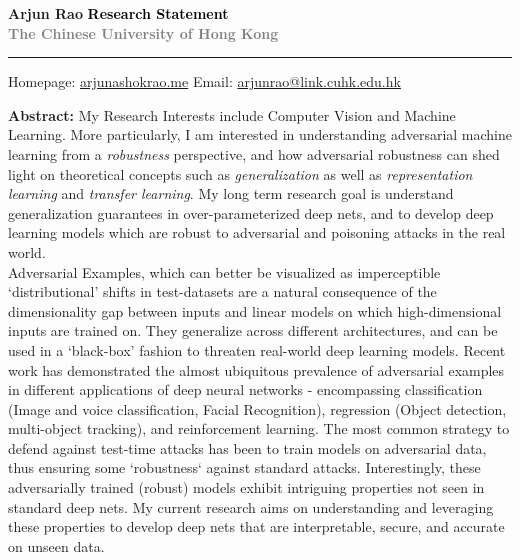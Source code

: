\documentclass[12pt]{article}
\newcommand{\HRule}[1][\medskipamount]{\par
  \vspace*{\dimexpr-\parskip-\baselineskip+#1}
  \noindent\rule{\linewidth}{0.3mm}\par
  \vspace*{\dimexpr-\parskip-.3\baselineskip+#1}}
\begin{document}
\thispagestyle{empty}
\Large \textbf{Arjun Rao} \hfill \Large  \textbf{\textcolor{black}{\Large{Research Statement} }} \\ \textcolor{gray}{\textbf{\hspace*{0.25in}\normalsize{The Chinese University of Hong Kong}}}
\HRule

\small Homepage: \href{https://arjunashokrao.me}{arjunashokrao.me} \quad Email: \href{mailto:arjunrao@link.cuhk.edu.hk}{arjunrao@link.cuhk.edu.hk}

\bigskip

\textbf{Abstract:} My Research Interests include Computer Vision and Machine Learning. More particularly, I am interested in understanding adversarial machine learning from a \emph{robustness} perspective, and how adversarial robustness can shed light on theoretical concepts such as \emph{generalization} as well as \emph{representation learning} and \emph{transfer learning}. My long term research goal is understand generalization guarantees in over-parameterized deep nets, and to develop deep learning models which are robust to adversarial and poisoning attacks in the real world.  \\

Adversarial Examples, which can better be visualized as imperceptible `distributional' shifts in test-datasets are a natural consequence of the dimensionality gap between inputs and linear models on which high-dimensional inputs are trained on.
They generalize across different architectures, and can be used in a `black-box' fashion to threaten real-world deep learning models. Recent work has demonstrated the almost ubiquitous prevalence of adversarial examples in different applications of deep neural networks - encompassing classification (Image and voice classification, Facial Recognition), regression (Object detection, multi-object tracking), and reinforcement learning. The most common strategy to defend against test-time attacks has been to train models on adversarial data, thus ensuring some `robustness` against standard attacks. Interestingly, these adversarially trained (robust) models exhibit intriguing properties not seen in standard deep nets. My current research aims on understanding and leveraging these properties to develop deep nets that are interpretable, secure, and accurate on unseen data. 
    \\
\end{document}
